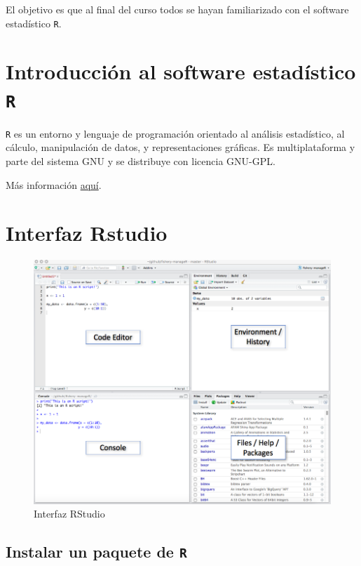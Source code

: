 \documentclass[]{book}
\begin{document}
El objetivo es que al final del curso todos se hayan familiarizado con
el software estadístico \texttt{R}.

\chapter{\texorpdfstring{Introducción al software estadístico
\texttt{R}}{Introducción al software estadístico R}}\label{intro}

\texttt{R} es un entorno y lenguaje de programación orientado al
análisis estadístico, al cálculo, manipulación de datos, y
representaciones gráficas. Es multiplataforma y parte del sistema GNU y
se distribuye con licencia GNU-GPL.

Más información
\href{https://es.wikipedia.org/wiki/R_(lenguaje_de_programaci\%C3\%B3n)}{aquí}.
~

\chapter{Interfaz Rstudio}\label{interfaz-rstudio}

\begin{figure}

{\centering \includegraphics[width=1\linewidth]{figures/rstudio_ide} 

}

\caption{Interfaz RStudio}\label{fig:pressure}
\end{figure}

\section{\texorpdfstring{Instalar un paquete de
\texttt{R}}{Instalar un paquete de R}}\label{instalar-un-paquete-de-r}
\end{document}
